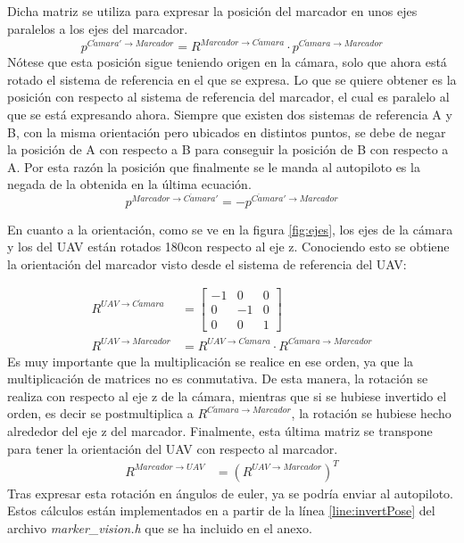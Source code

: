 \begin{enumerate}
Dicha matriz se utiliza para expresar la posición del marcador en unos ejes paralelos a los ejes del marcador. 
	\begin{equation}
	p^{C\acute{a}mara' \rightarrow Marcador} = R^{Marcador \rightarrow C\acute{a}mara} \cdot p^{C\acute{a}mara \rightarrow Marcador}
	\end{equation}
Nótese que esta posición sigue teniendo origen en la cámara, solo que ahora está rotado el sistema de referencia en el que se expresa. Lo que se quiere obtener es la posición con respecto al sistema de referencia del marcador, el cual es paralelo al que se está expresando ahora. Siempre que existen dos sistemas de referencia A y B, con la misma orientación pero ubicados en distintos puntos, se debe de negar la posición de A con respecto a B para conseguir la posición de B con respecto a A. Por esta razón la posición que finalmente se le manda al autopiloto es la negada de la obtenida en la última ecuación.   
	\begin{equation}
	p^{Marcador \rightarrow C\acute{a}mara' } = - p^{C\acute{a}mara' \rightarrow Marcador}
	\end{equation}

 En cuanto a la orientación, como se ve en la figura \ref{fig:ejes}, los ejes de la cámara y los del UAV están rotados 180\textdegree con respecto al eje z. Conociendo esto se obtiene la orientación del marcador visto desde el sistema de referencia del UAV:

	\begin{align}
	R^{UAV\rightarrow C\acute{a}mara}& = \begin{bmatrix} -1 & 0 & 0\\ 0 & -1 & 0 \\ 0 & 0 & 1 \end{bmatrix}\\
	R^{UAV \rightarrow Marcador}& = R^{UAV\rightarrow C\acute{a}mara}\cdot R^{C\acute{a}mara\rightarrow Marcador}
	\end{align}
Es muy importante que la multiplicación se realice en ese orden, ya que la multiplicación de matrices no es conmutativa. De esta manera, la rotación se realiza con respecto al eje z de la cámara, mientras que si se hubiese invertido el orden, es decir se postmultiplica a $R^{C\acute{a}mara\rightarrow Marcador}$, la rotación se hubiese hecho alrededor del eje z del marcador.
	Finalmente, esta última matriz se transpone para tener la orientación del UAV con respecto al marcador.
	\begin{align}
	R^{Marcador \rightarrow UAV}& = \left(R^{UAV \rightarrow Marcador}\right)^T
	\end{align}
	Tras expresar esta rotación en ángulos de euler, ya se podría enviar al autopiloto.
	Estos cálculos están implementados en a partir de la línea \ref{line:invertPose} del archivo \textit{marker\_vision.h} que se ha incluido en el anexo.



\end{enumerate}
